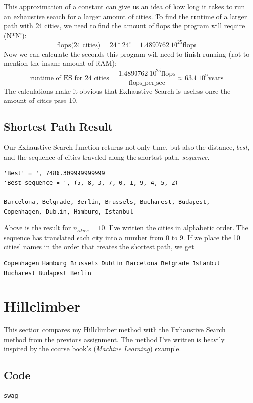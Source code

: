 \documentclass[10pt, a4paper]{article}
\begin{document}
This approximation of a constant can give us an idea of how long it takes to run an exhaustive search for a larger amount of cities.
To find the runtime of a larger path with 24 cities, we need to find the amount of flops the program will require (N$*$N!):
$$\text{flops(24 cities)} = 24*24! = 1.4890762\ 10^{25} \text{flops}$$
Now we can calculate the seconds this program will need to finish running (not to mention the insane amount of RAM):
$$\text{runtime of ES for 24 cities} = \frac{1.4890762\ 10^{25} \text{flops}}{\text{flops\_per\_sec}} \approx 63.4\ 10^{9} \text{years} $$
The calculations make it obvious that Exhaustive Search is useless once the amount of cities pass 10.
\subsection{Shortest Path Result}

Our Exhaustive Search function returns not only time, but also the distance, \emph{best}, and the sequence of cities traveled along the shortest path, \emph{sequence}.
\begin{lstlisting}
'Best' = ', 7486.309999999999
'Best sequence = ', (6, 8, 3, 7, 0, 1, 9, 4, 5, 2)

Barcelona, Belgrade, Berlin, Brussels, Bucharest, Budapest, Copenhagen, Dublin, Hamburg, Istanbul
\end{lstlisting}
Above is the result for $n_{cities} = 10$. I've written the cities in alphabetic order. The sequence has translated each city into a number from 0 to 9. 
If we place the 10 cities' names in the order that creates the shortest path, we get: 
\begin{lstlisting}
Copenhagen Hamburg Brussels Dublin Barcelona Belgrade Istanbul Bucharest Budapest Berlin 
\end{lstlisting}
\clearpage
\section{Hillclimber}
This section compares my Hillclimber method with the Exhaustive Search method from the previous assignment. The method I've written is heavily inspired by the course book's (\emph{Machine Learning}) example.
\subsection{Code}
\begin{lstlisting}[language = Python]
swag

\end{lstlisting}
\end{document}
